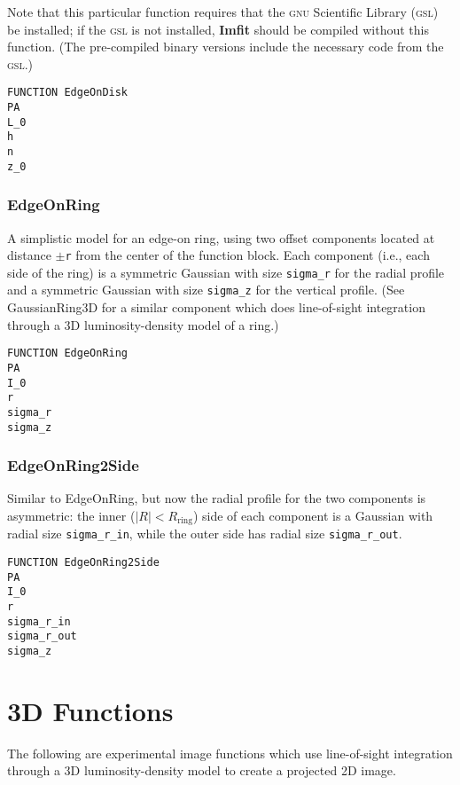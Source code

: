 \documentclass[10pt,a4paper,article]{memoir}
\newcommand{\imfit}{\textbf{Imfit}}
\begin{document}
Note that this particular function requires that the \textsc{gnu} Scientific Library
(\textsc{gsl}) be installed; if the \textsc{gsl} is not installed, \imfit{} should be compiled
without this function. (The pre-compiled binary versions include the necessary
code from the \textsc{gsl}.)

\begin{verbatim}
FUNCTION EdgeOnDisk
PA
L_0
h
n
z_0
\end{verbatim}


\subsubsection{EdgeOnRing}

A simplistic model for an edge-on ring, using two offset components located
at distance $\pm$\texttt{r} from the center of the function block. Each component
(i.e., each side of the ring) is a symmetric Gaussian with size
\texttt{sigma\_r} for the radial profile and a symmetric Gaussian with
size \texttt{sigma\_z} for the vertical profile. (See GaussianRing3D for a similar
component which does line-of-sight integration through a 3D luminosity-density
model of a ring.)

\begin{verbatim}
FUNCTION EdgeOnRing
PA
I_0
r
sigma_r
sigma_z
\end{verbatim}


\subsubsection{EdgeOnRing2Side}

Similar to EdgeOnRing, but now the radial profile for the two components is
asymmetric: the inner ($|R| < R_{\mathrm{ring}}$) side of each component is a Gaussian
with radial size \texttt{sigma\_r\_in}, while the outer side has radial size
\texttt{sigma\_r\_out}.

\begin{verbatim}
FUNCTION EdgeOnRing2Side
PA
I_0
r
sigma_r_in
sigma_r_out
sigma_z
\end{verbatim}


\section{3D Functions}

The following are experimental image functions which use line-of-sight
integration through a 3D luminosity-density model to create a projected 2D
image.
\end{document}
